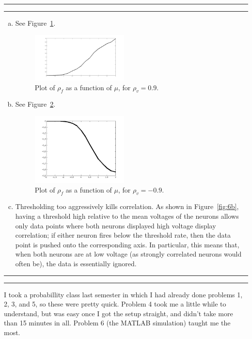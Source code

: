 \documentclass[11pt]{article}
\newcounter{questionCounter}
\newcounter{partCounter}[questionCounter]
\newenvironment{question}[2][\arabic{questionCounter}]{%
    \setcounter{partCounter}{0}%
    \vspace{.25in} \hrule \vspace{0.5em}%
        \noindent{\bf #2}%
    \vspace{0.8em} \hrule \vspace{.10in}%
    \addtocounter{questionCounter}{1}%
}{}
\begin{document}
\begin{question}{Problem 6}
\begin{enumerate}[a.]
\item See Figure~\ref{fig:6d}.
\begin{figure}[h]
\begin{center}
\includegraphics[width=0.46\textwidth]{6d}
\end{center}
\caption{Plot of $\rho_f$ as a function of $\mu$, for $\rho_v = 0.9$.}
\label{fig:6d}
\end{figure}

\item See Figure~\ref{fig:6e}.
\begin{figure}[h]
\begin{center}
\includegraphics[width=0.46\textwidth]{6e}
\end{center}
\caption{Plot of $\rho_f$ as a function of $\mu$, for $\rho_v = -0.9$.}
\label{fig:6e}
\end{figure}

\item Thresholding too aggressively kills correlation. As shown in
Figure~\ref{fig:6b}, having a threshold high relative to the mean voltages of
the neurons allows only data points where both neurons displayed high voltage
display correlation; if either neuron fires below the threshold rate, then the
data point is pushed onto the corresponding axis. In particular, this means
that, when both neurons are at low voltage (as strongly correlated neurons
would often be), the data is essentially ignored.
\end{enumerate}
\end{question}

\newpage
\begin{question}{Problem 7}
I took a probabillity class last semester in which I had already done problems
1, 2, 3, and 5, so these were pretty quick. Problem 4 took me a little while to
understand, but was easy once I got the setup straight, and didn't take more
than 15 minutes in all. Problem 6 (the MATLAB simulation) taught me the most.
\end{question}
\end{document}
